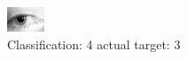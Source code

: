 \begin{figure}[h!]
\begin{center}
\includegraphics[width=0.60\columnwidth]{figures/ID1382_class_4_target_3.png}
\end{center}
\caption{ Classification: 4 actual target: 3}
\label{fig:ID1382_class_4_target_3}
\end{figure}
